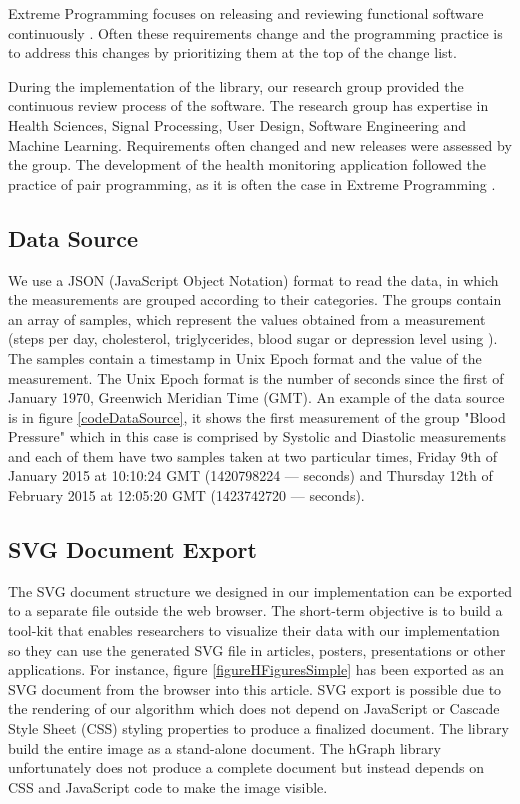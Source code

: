 \documentclass[twocolumn]{bmcart}%
\begin{document}
Extreme Programming focuses on releasing and reviewing functional software continuously \cite{beck2000extreme}. Often these requirements change and the programming practice is to address this changes by prioritizing them at the top of the change list.

During the implementation of the library, our research group provided the continuous review process of the software. The research group has expertise in Health Sciences, Signal Processing, User Design, Software Engineering and Machine Learning. Requirements often changed and new releases were assessed by the group. The development of the health monitoring application followed the practice of pair programming, as it is often the case in Extreme Programming \cite{roebuck2012agile}.

\subsection*{Data Source}

We use a JSON (JavaScript Object Notation) format to read the data, in which the measurements are grouped according to their categories. The groups contain an array of samples, which represent the values obtained from a measurement (steps per day, cholesterol, triglycerides, blood sugar or depression level using \cite{poutanen2010validity}). The samples contain a timestamp in Unix Epoch format and the value of the measurement. The Unix Epoch format is the number of seconds since the first of January 1970, Greenwich Meridian Time (GMT). An example of the data source is in figure \ref{codeDataSource}, it shows the first measurement of the group "Blood Pressure" which in this case is comprised by Systolic and Diastolic measurements and each of them have two samples taken at two particular times, Friday 9th of January 2015 at 10:10:24 GMT (1420798224 --- seconds) and Thursday 12th of February 2015 at 12:05:20 GMT (1423742720 --- seconds).

\subsection*{SVG Document Export}

The SVG document structure we designed in our implementation can be exported to a separate file outside the web browser. The short-term objective is to build a tool-kit that enables researchers to visualize their data with our implementation so they can use the generated SVG file in articles, posters, presentations or other applications. For instance, figure \ref{figureHFiguresSimple} has been exported as an SVG document from the browser into this article. SVG export is possible due to the rendering of our algorithm which does not depend on JavaScript or Cascade Style Sheet (CSS) styling properties to produce a finalized document. The library build the entire image as a stand-alone document. The hGraph library unfortunately does not produce a complete document but instead depends on CSS and JavaScript code to make the image visible.
\end{document}
